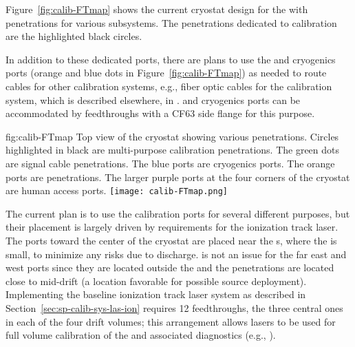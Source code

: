 
Figure~\ref{fig:calib-FTmap} shows the current cryostat design for the %
 with penetrations for various subsystems. The penetrations dedicated to calibration are the highlighted black circles. 

In addition to these dedicated ports, there are plans to use the  and cryogenics ports (orange and blue dots in Figure~\ref{fig:calib-FTmap}) as needed to route cables for other calibration systems, e.g., fiber optic cables for the  calibration system, which is described elsewhere, in  \spchpds.  and cryogenics ports can be accommodated by feedthroughs with a CF63 side flange for this purpose.   

\begin{dunefigure}{fig:calib-FTmap}
{Top view of the \spmod %
cryostat showing various penetrations. Circles highlighted in black are multi-purpose calibration penetrations. The green dots are  signal cable penetrations. The blue ports are cryogenics ports. The orange ports are  penetrations. The larger purple ports at the four corners of the cryostat are human access ports.}
\texttt{[image: calib-FTmap.png]}
\end{dunefigure}

The current plan is to use the calibration ports for several different purposes, but their placement is largely driven by requirements for the ionization track laser. %
The ports %
toward the center of the cryostat are placed near the s, where the \efield is small, %
to minimize any risks due to %
 discharge.  is not an issue for the far east and west ports since they are located outside the  and the penetrations are located %
close to mid-drift (a location favorable for possible source deployment).
Implementing the baseline ionization track laser system as %
described in Section~\ref{sec:sp-calib-sys-las-ion} requires \num{12} feedthroughs, the three central ones in each of the four  drift volumes; this arrangement allows lasers to be used for full volume calibration of the \efield and associated diagnostics (e.g., ). 

